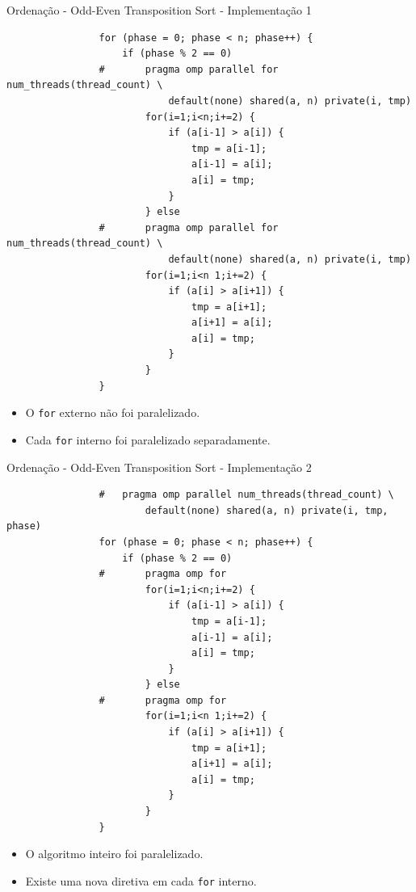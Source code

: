 	\begin{frame}[fragile]{Ordenação - Odd-Even Transposition Sort - Implementação 1}
		\begin{multicols}{2}
			\begin{verbatim}
				for (phase = 0; phase < n; phase++) { 
					if (phase % 2 == 0)
				#		pragma omp parallel for num_threads(thread_count) \ 
							default(none) shared(a, n) private(i, tmp)
						for(i=1;i<n;i+=2) { 
							if (a[i-1] > a[i]) {
								tmp = a[i-1]; 
								a[i-1] = a[i]; 
								a[i] = tmp;
							} 
						} else
				#		pragma omp parallel for num_threads(thread_count) \
							default(none) shared(a, n) private(i, tmp) 
						for(i=1;i<n 1;i+=2) {
							if (a[i] > a[i+1]) { 
								tmp = a[i+1]; 
								a[i+1] = a[i]; 
								a[i] = tmp;
							}
						}
				} 
			\end{verbatim}
		\columnbreak
			\begin{itemize}
				\setlength\itemsep{3em}
				\item O {\tt for} externo não foi paralelizado.
				\item Cada {\tt for} interno foi paralelizado separadamente.
			\end{itemize}
		\end{multicols}
\end{frame}


	\begin{frame}[fragile]{Ordenação - Odd-Even Transposition Sort - Implementação 2}
		\begin{multicols}{2}
			\begin{verbatim}
				# 	pragma omp parallel num_threads(thread_count) \ 
						default(none) shared(a, n) private(i, tmp, phase)
				for (phase = 0; phase < n; phase++) { 
					if (phase % 2 == 0)
				#		pragma omp for
						for(i=1;i<n;i+=2) { 
							if (a[i-1] > a[i]) {
								tmp = a[i-1]; 
								a[i-1] = a[i]; 
								a[i] = tmp;
							} 
						} else
				#		pragma omp for
						for(i=1;i<n 1;i+=2) {
							if (a[i] > a[i+1]) { 
								tmp = a[i+1]; 
								a[i+1] = a[i]; 
								a[i] = tmp;
							}
						}
				} 
			\end{verbatim}
		\columnbreak
			\begin{itemize}
				\setlength\itemsep{3em}
				\item O algoritmo inteiro foi paralelizado.
				\item Existe uma nova diretiva em cada {\tt for} interno.
			\end{itemize}
		\end{multicols}
\end{frame}


